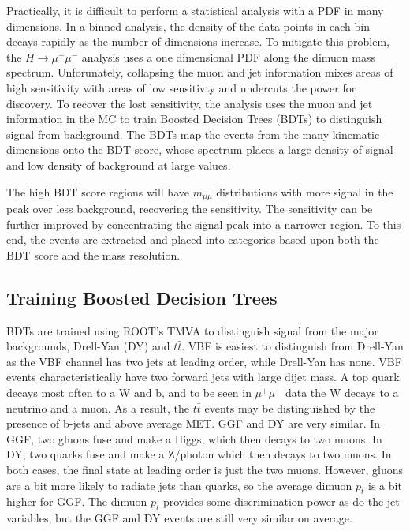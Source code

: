 Practically, it is difficult to perform a statistical analysis with a PDF in many dimensions. In a binned analysis, the density of the data points in each bin decays rapidly as the number of dimensions increase. To mitigate this problem, the $H\rightarrow\mu^+\mu^-$ analysis uses a one dimensional PDF along the dimuon mass spectrum. Unforunately, collapsing the muon and jet information mixes areas of high sensitivity with areas of low sensitivty and undercuts the power for discovery. To recover the lost sensitivity, the analysis uses the muon and jet information in the MC to train Boosted Decision Trees (BDTs) to distinguish signal from background. The BDTs map the events from the many kinematic dimensions onto the BDT score, whose spectrum places a large density of signal and low density of background at large values.  

The high BDT score regions will have $m_{\mu\mu}$ distributions with more signal in the peak over less background, recovering the sensitivity. The sensitivity can be further improved by concentrating the signal peak into a narrower region. To this end, the events are extracted and placed into categories based upon both the BDT score and the mass resolution.     

\subsection{Training Boosted Decision Trees}

BDTs are trained using ROOT's TMVA to distinguish signal from the major backgrounds, Drell-Yan (DY) and $t\bar{t}$. VBF is easiest to distinguish from Drell-Yan as the VBF channel has two jets at leading order, while Drell-Yan has none. VBF events characteristically have two forward jets with large dijet mass. A top quark decays most often to a W and b, and to be seen in $\mu^+\mu^-$ data the W decays to a neutrino and a muon. As a result, the $t\bar{t}$ events may be distinguished by the presence of b-jets and above average MET. GGF and DY are very similar. In GGF, two gluons fuse and make a Higgs, which then decays to two muons. In DY, two quarks fuse and make a Z/photon which then decays to two muons.  In both cases, the final state at leading order is just the two muons. However, gluons are a bit more likely to radiate jets than quarks, so the average dimuon $p_t$ is a bit higher for GGF. The dimuon $p_t$ provides some discrimination power as do the jet variables, but the GGF and DY events are still very similar on average.  

